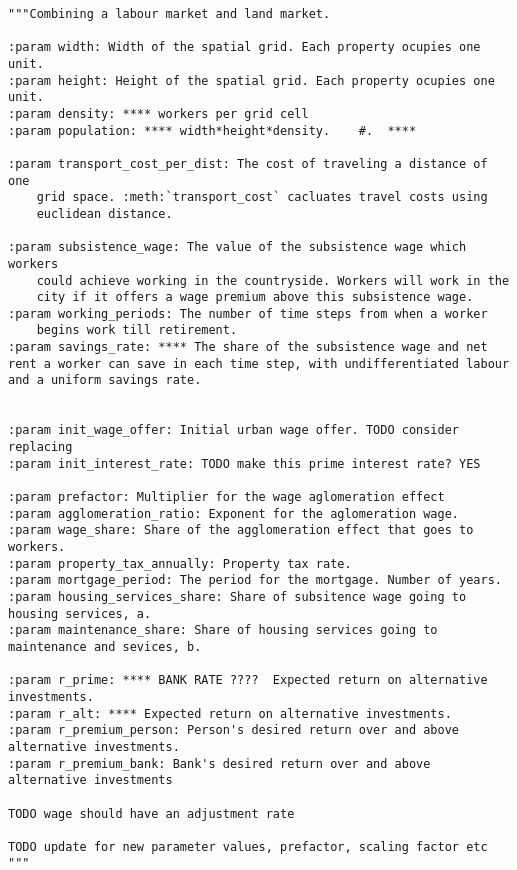 \begin{lstlisting}
"""Combining a labour market and land market.

:param width: Width of the spatial grid. Each property ocupies one unit.
:param height: Height of the spatial grid. Each property ocupies one unit.
:param density: **** workers per grid cell
:param population: **** width*height*density.    #.  ****

:param transport_cost_per_dist: The cost of traveling a distance of one
    grid space. :meth:`transport_cost` cacluates travel costs using
    euclidean distance.
    
:param subsistence_wage: The value of the subsistence wage which workers
    could achieve working in the countryside. Workers will work in the
    city if it offers a wage premium above this subsistence wage.
:param working_periods: The number of time steps from when a worker
    begins work till retirement.
:param savings_rate: **** The share of the subsistence wage and net rent a worker can save in each time step, with undifferentiated labour and a uniform savings rate.


:param init_wage_offer: Initial urban wage offer. TODO consider replacing
:param init_interest_rate: TODO make this prime interest rate? YES

:param prefactor: Multiplier for the wage aglomeration effect 
:param agglomeration_ratio: Exponent for the aglomeration wage.
:param wage_share: Share of the agglomeration effect that goes to workers.
:param property_tax_annually: Property tax rate.
:param mortgage_period: The period for the mortgage. Number of years.
:param housing_services_share: Share of subsitence wage going to housing services, a.
:param maintenance_share: Share of housing services going to maintenance and sevices, b.

:param r_prime: **** BANK RATE ????  Expected return on alternative investments.
:param r_alt: **** Expected return on alternative investments.
:param r_premium_person: Person's desired return over and above 
alternative investments.
:param r_premium_bank: Bank's desired return over and above alternative investments

TODO wage should have an adjustment rate

TODO update for new parameter values, prefactor, scaling factor etc
"""
\end{lstlisting}


